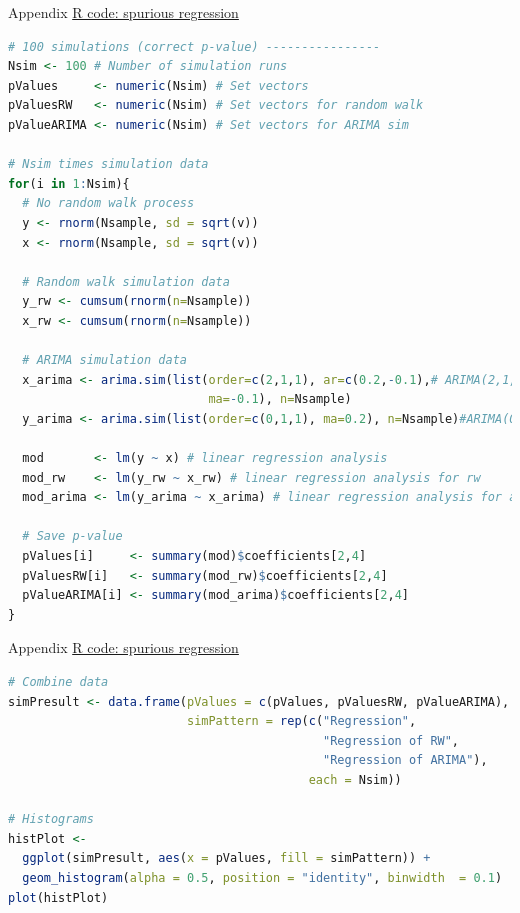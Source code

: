 \documentclass{beamer}
\begin{document}
\begin{frame}[fragile]{Appendix}
    \underline{R code: spurious regression}
    \fontsize{6pt}{6pt}\selectfont
    \begin{lstlisting}[language=R]
# 100 simulations (correct p-value) ----------------
Nsim <- 100 # Number of simulation runs
pValues     <- numeric(Nsim) # Set vectors
pValuesRW   <- numeric(Nsim) # Set vectors for random walk
pValueARIMA <- numeric(Nsim) # Set vectors for ARIMA sim

# Nsim times simulation data 
for(i in 1:Nsim){ 
  # No random walk process
  y <- rnorm(Nsample, sd = sqrt(v))
  x <- rnorm(Nsample, sd = sqrt(v))
  
  # Random walk simulation data
  y_rw <- cumsum(rnorm(n=Nsample))
  x_rw <- cumsum(rnorm(n=Nsample))
  
  # ARIMA simulation data
  x_arima <- arima.sim(list(order=c(2,1,1), ar=c(0.2,-0.1),# ARIMA(2,1,1)  
                            ma=-0.1), n=Nsample) 
  y_arima <- arima.sim(list(order=c(0,1,1), ma=0.2), n=Nsample)#ARIMA(0,1,1)
                            
  mod       <- lm(y ~ x) # linear regression analysis
  mod_rw    <- lm(y_rw ~ x_rw) # linear regression analysis for rw
  mod_arima <- lm(y_arima ~ x_arima) # linear regression analysis for arima
  
  # Save p-value
  pValues[i]     <- summary(mod)$coefficients[2,4]
  pValuesRW[i]   <- summary(mod_rw)$coefficients[2,4]
  pValueARIMA[i] <- summary(mod_arima)$coefficients[2,4]
}
    \end{lstlisting}
\end{frame}

\begin{frame}[fragile]{Appendix}
    \underline{R code: spurious regression}
    \fontsize{6pt}{6pt}\selectfont
    \begin{lstlisting}[language=R]
# Combine data 
simPresult <- data.frame(pValues = c(pValues, pValuesRW, pValueARIMA),
                         simPattern = rep(c("Regression", 
                                            "Regression of RW",
                                            "Regression of ARIMA"), 
                                          each = Nsim))

# Histograms
histPlot <- 
  ggplot(simPresult, aes(x = pValues, fill = simPattern)) + 
  geom_histogram(alpha = 0.5, position = "identity", binwidth  = 0.1)
plot(histPlot)
    \end{lstlisting}
\end{frame}
\end{document}
